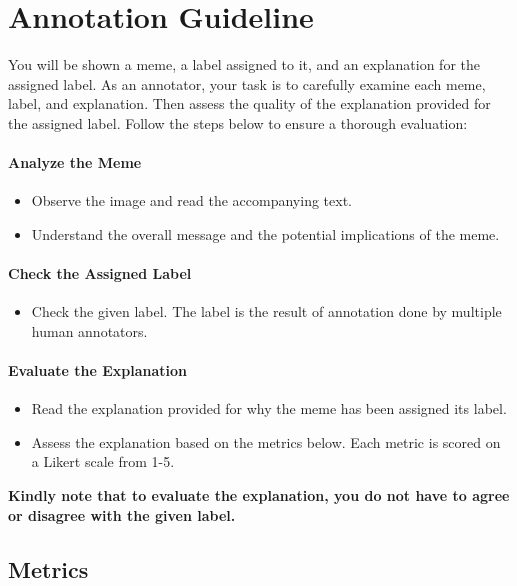 \section{Annotation Guideline}
\label{sec:app_annotation_guideline}
You will be shown a meme, a label assigned to it, and an explanation for the assigned label. As an annotator, your task is to carefully examine each meme, label, and explanation. Then assess the quality of the explanation provided for the assigned label.
Follow the steps below to ensure a thorough evaluation:

\paragraph{Analyze the Meme}
\begin{itemize}[noitemsep,topsep=0pt,labelsep=.5em] %
    \item Observe the image and read the accompanying text.
    \item Understand the overall message and the potential implications of the meme.
\end{itemize}
\paragraph{Check the Assigned Label}
\begin{itemize}
    \item Check the given label. The label is the result of annotation done by multiple human annotators.
\end{itemize}

\paragraph{Evaluate the Explanation}
\begin{itemize}[noitemsep,topsep=0pt,labelsep=.5em] %
    \item Read the explanation provided for why the meme has been assigned its label.
    \item Assess the explanation based on the metrics below. Each metric is scored on a Likert scale from 1-5. 
\end{itemize}

\textbf{Kindly note that to evaluate the explanation, you do not have to agree or disagree with the given label.}

\subsection{Metrics}

